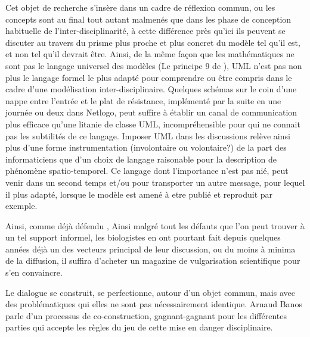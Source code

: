 Cet objet de recherche s'insère dans un cadre de réflexion commun, ou les concepts sont au final tout autant malmenés que dans les phase de conception habituelle de l'inter-disciplinarité, à cette différence près qu'ici ils peuvent se discuter au travers du prisme plus proche et plus concret du modèle tel qu'il est, et non tel qu'il devrait être. Ainsi, de la même façon que les mathématiques ne sont pas le langage universel des modèles (Le principe 9 de \textcite[82]{Banos2013}), UML n'est pas non plus le langage formel le plus adapté pour comprendre ou être compris dans le cadre d'une modélisation inter-disciplinaire. Quelques schémas sur le coin d'une nappe entre l'entrée et le plat de résistance, implémenté par la suite en une journée ou deux dans Netlogo, peut suffire à établir un canal de communication plus efficace qu'une litanie de classe UML, incompréhensible pour qui ne connait pas les subtilités de ce langage. Imposer UML dans les discussions relève ainsi plus d'une forme instrumentation (involontaire ou volontaire?) de la part des informaticiens que d'un choix de langage raisonable pour la description de phénomène spatio-temporel. Ce langage dont l'importance n'est pas nié, peut venir dans un second temps et/ou pour transporter un autre message, pour lequel il plus adapté, lorsque le modèle est amené à etre publié et reproduit par exemple. 

Ainsi, comme déjà défendu \textcite{Chapron2014},  Ainsi malgré tout les défauts que l'on peut trouver à un tel support informel, les biologistes en ont pourtant fait depuis quelques années déjà un des vecteurs principal de leur discussion, ou du moins à minima de la diffusion, il suffira d'acheter un magazine de vulgarisation scientifique pour s'en convaincre.

Le dialogue se construit, se perfectionne, autour d'un objet commun, mais avec des problématiques qui elles ne sont pas nécessairement identique. Arnaud Banos parle d'un processus de co-construction, gagnant-gagnant pour les différentes parties qui accepte les règles du jeu de cette mise en danger disciplinaire.

